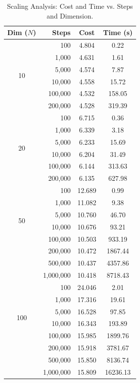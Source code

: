 \documentclass[letterpaper]{article} %
\begin{document}
\begin{table}[h]
\centering
\small
\caption{Scaling Analysis: Cost and Time vs. Steps and Dimension.}
\label{tab:scaling_results}
\begin{tabular}{c r c c}
\toprule
\textbf{Dim ($N$)} & \textbf{Steps} & \textbf{Cost} & \textbf{Time (s)} \\
\midrule
\multirow{6}{*}{10} 
  & 100     & 4.804 & 0.22 \\
  & 1,000   & 4.631 & 1.61 \\
  & 5,000   & 4.574 & 7.87 \\
  & 10,000  & 4.558 & 15.72 \\
  & 100,000 & 4.532 & 158.05 \\
  & 200,000 & 4.528 & 319.39 \\
\midrule
\multirow{6}{*}{20}
  & 100     & 6.715 & 0.36 \\
  & 1,000   & 6.339 & 3.18 \\
  & 5,000   & 6.233 & 15.69 \\
  & 10,000  & 6.204 & 31.49 \\
  & 100,000 & 6.144 & 313.63 \\
  & 200,000 & 6.135 & 627.98 \\
\midrule
\multirow{6}{*}{50} 
  & 100     & 12.689 & 0.99 \\
  & 1,000   & 11.082 & 9.38 \\
  & 5,000   & 10.760 & 46.70 \\
  & 10,000  & 10.676 & 93.21 \\
  & 100,000 & 10.503 & 933.19 \\
  & 200,000 & 10.472 & 1867.44 \\
  & 500,000 & 10.437 & 4357.86 \\
  & 1,000,000 & 10.418 & 8718.43 \\
\midrule
\multirow{6}{*}{100} 
  & 100     & 24.046 & 2.01 \\
  & 1,000   & 17.316 & 19.61 \\
  & 5,000   & 16.528 & 97.85 \\
  & 10,000  & 16.343 & 193.89 \\
  & 100,000 & 15.985 & 1899.76 \\
  & 200,000 & 15.918 & 3781.67 \\
  & 500,000 & 15.850 & 8136.74 \\
  & 1,000,000 & 15.809 & 16236.13 \\
\bottomrule
\end{tabular}
\end{table}
\end{document}
